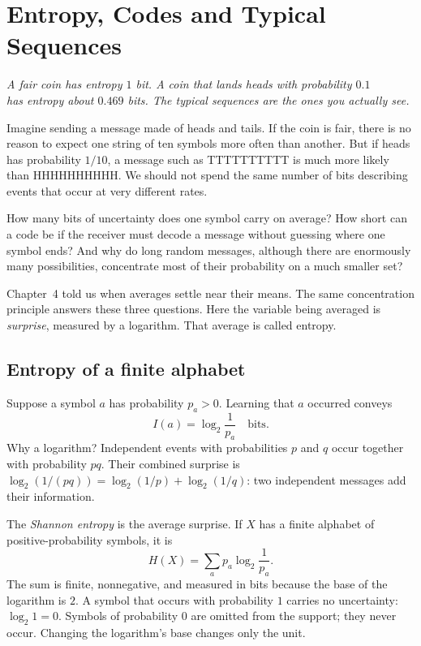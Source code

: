 \chapter{Entropy, Codes and Typical Sequences}

\begin{center}\itshape
A fair coin has entropy $1$ bit. A coin that lands heads with probability $0.1$\\
has entropy about $0.469$ bits. The typical sequences are the ones you actually see.
\end{center}

Imagine sending a message made of heads and tails. If the coin is fair, there is no reason to expect one string of ten symbols more often than another. But if heads has probability $1/10$, a message such as TTTTTTTTTT is much more likely than HHHHHHHHHH. We should not spend the same number of bits describing events that occur at very different rates.

How many bits of uncertainty does one symbol carry on average? How short can a code be if the receiver must decode a message without guessing where one symbol ends? And why do long random messages, although there are enormously many possibilities, concentrate most of their probability on a much smaller set?

Chapter~4 told us when averages settle near their means. The same concentration principle answers these three questions. Here the variable being averaged is \emph{surprise}, measured by a logarithm. That average is called entropy.

\section{Entropy of a finite alphabet}

Suppose a symbol $a$ has probability $p_a>0$. Learning that $a$ occurred conveys
\[
 I(a)=\log_2\frac1{p_a}\quad\text{bits}.
\]
Why a logarithm? Independent events with probabilities $p$ and $q$ occur together with probability $pq$. Their combined surprise is
\(\log_2(1/(pq))=\log_2(1/p)+\log_2(1/q)\): two independent messages add their information.

The \emph{Shannon entropy} is the average surprise. If $X$ has a finite alphabet of positive-probability symbols, it is
\[
 H(X)=\sum_a p_a\log_2\frac1{p_a}.
\]
The sum is finite, nonnegative, and measured in bits because the base of the logarithm is $2$. A symbol that occurs with probability $1$ carries no uncertainty: $\log_2 1=0$. Symbols of probability $0$ are omitted from the support; they never occur. Changing the logarithm's base changes only the unit.

